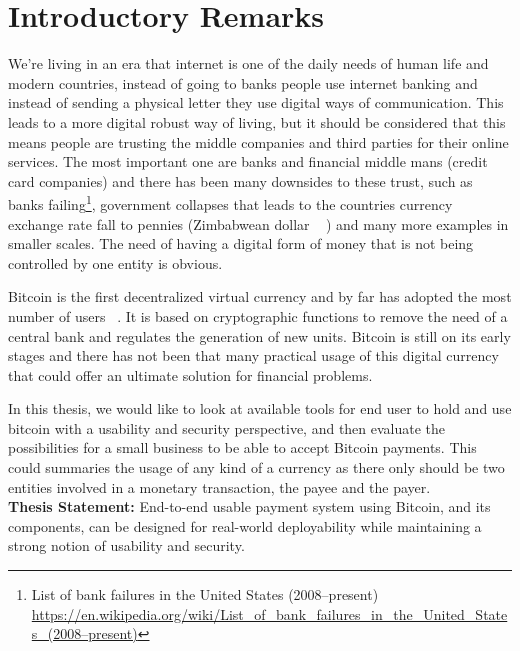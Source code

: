 
\setcounter{page}{1}

\chapter{Introductory Remarks}

We're living in an era that internet is one of the daily needs of human life and modern countries, instead of going to banks people use internet banking and instead of sending a physical letter they use digital ways of communication. This leads to a more digital robust way of living, but it should be considered that this means people are trusting the middle companies and third parties for their online services. The most important one are banks and financial middle mans (\eg credit card companies) and there has been many downsides to these trust, such as banks failing\footnote{List of bank failures in the United States (2008–present) \url{https://en.wikipedia.org/wiki/List_of_bank_failures_in_the_United_States_(2008–present)}}, government collapses that leads to the countries currency exchange rate fall to pennies (\eg Zimbabwean dollar ~\cite{hanke2009measurement} ) and many more examples in smaller scales. The need of having a digital form of money that is not being controlled by one entity is obvious.

Bitcoin is the first decentralized virtual currency and by far has adopted the most number of users ~\cite{Nak08}. It is based on cryptographic functions to remove the need of a central bank and regulates the generation of new units. Bitcoin is still on its early stages and there has not been that many practical usage of this digital currency that could offer an ultimate solution for financial problems.

In this thesis, we would like to look at available tools for end user to hold and use bitcoin with a usability and security perspective, and then evaluate the possibilities for a small business to be able to accept Bitcoin payments. This could summaries the usage of any kind of a currency as there only should be two entities involved in a monetary transaction, the payee and the payer.\\

\textbf{Thesis Statement:} End-to-end usable payment system using Bitcoin, and its components, can be designed for real-world deployability while maintaining a strong notion of usability and security.

